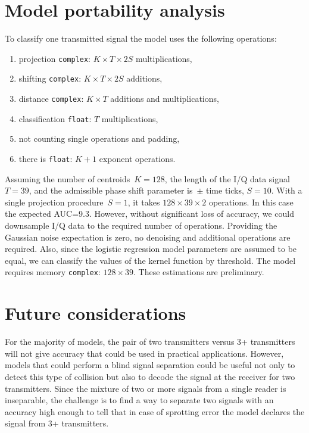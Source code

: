 \documentclass[12pt]{article}
\begin{document}
\section{Model portability analysis}
To classify one transmitted signal the model uses the following operations:
\begin{enumerate}[1)]
\item projection \texttt{complex}: $K \times T \times 2S$ multiplications,
\item shifting \texttt{complex}: $K \times T \times 2S$ additions,
\item distance  \texttt{complex}: $K \times T$ additions and multiplications,
\item classification \texttt{float}: $T$  multiplications,
\item not counting single operations and padding,
\item there is \texttt{float}: $K+1$ exponent operations.
\end{enumerate}
Assuming the number of centroids~$K=128$, the length of the I/Q data signal $T=39$, and the admissible phase shift parameter is~$\pm$ time ticks, $S=10$. %
With a single projection procedure~$S=1$, it takes $128\times 39 \times 2$ operations. In this case the expected AUC=9.3. However, without significant loss of accuracy, we could downsample I/Q data to the required number of operations. Providing the Gaussian noise expectation is zero, no denoising and additional operations are required. Also, since the logistic regression model parameters are assumed to be equal, we can classify the values of the kernel function by threshold. 
The model requires memory \texttt{complex}: $128\times 39$. %
These estimations are preliminary. 

\section{Future considerations}\label{ICA}
For the majority of models, the pair of two transmitters versus 3+ transmitters will not give accuracy that could be used in practical applications. However, models that could perform a blind signal separation could be useful not only to detect this type of collision but also to decode the signal at the receiver for two transmitters. Since the mixture of two or more signals from a single reader is inseparable, the challenge is to find a way to separate two signals with an accuracy high enough to tell that in case of sprotting error the model declares the signal from 3+ transmitters.
\end{document}

